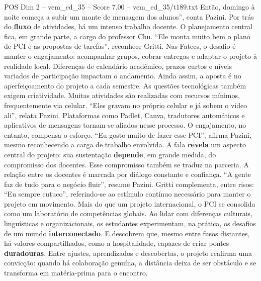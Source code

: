 \begin{textsample}{POS Dim 2 – vem\_ed\_35 – Score 7.00 – vem\_ed\_35/t189.txt}
Então, domingo à noite começa a subir um monte de mensagem dos alunos”, conta Pazini.
Por trás do \textbf{fluxo} de atividades, há um intenso trabalho docente.
O planejamento central fica, em grande parte, a cargo do professor Chu. “Ele monta muito bem o plano de PCI e as propostas de tarefas”, reconhece Gritti.
Nas Fatecs, o desafio é manter o engajamento: acompanhar grupos, cobrar entregas e adaptar o projeto à realidade local.
Diferenças de calendário acadêmico, prazos curtos e níveis variados de participação impactam o andamento.
Ainda assim, a aposta é no aperfeiçoamento do projeto a cada semestre.
As questões tecnológicas também exigem criatividade.
Muitas atividades são realizadas com recursos mínimos, frequentemente via celular. “Eles gravam no próprio celular e já sobem o vídeo ali”, relata Pazini.
Plataformas como Padlet, Canva, tradutores automáticos e aplicativos de mensagens tornam-se aliados nesse processo.
O engajamento, no entanto, compensa o esforço. “Eu gosto muito de fazer esse PCI”, afirma Pazini, mesmo reconhecendo a carga de trabalho envolvida.
A fala \textbf{revela} um aspecto central do projeto: sua sustentação \textbf{depende}, em grande medida, do compromisso dos docentes.
Esse compromisso também se traduz na parceria.
A relação entre os docentes é marcada por diálogo constante e confiança. “A gente faz de tudo para o negócio fluir”, resume Pazini.
Gritti complementa, entre risos: “Eu sempre cutuco”, referindo-se ao estímulo contínuo necessário para manter o projeto em movimento.
Mais do que um projeto internacional, o PCI se consolida como um laboratório de competências globais.
Ao lidar com diferenças culturais, linguísticas e organizacionais, os estudantes experimentam, na prática, os desafios de um mundo \textbf{interconectado}.
E descobrem que, mesmo entre fusos distantes, há valores compartilhados, como a hospitalidade, capazes de criar pontes \textbf{duradouras}.
Entre ajustes, aprendizados e descobertas, o projeto reafirma uma convicção: quando há colaboração genuína, a distância deixa de ser obstáculo e se transforma em matéria-prima para o encontro.

\end{textsample}
